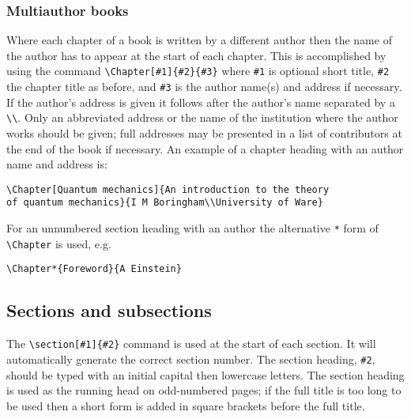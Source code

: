 \subsubsection{Multiauthor books}
Where each chapter of a book is written by a different author 
then the name of the author has to appear at the start of each 
chapter. This is accomplished by using the command
\hbox{\verb"\Chapter[#1]{#2}{#3}"} where \verb"#1" is 
optional short title, \verb"#2" the chapter title as before,
and \verb"#3" is the author name(s) and address if necessary.
If the author's address is given it follows after the author's name
separated by a \verb"\\". Only an abbreviated address or the name of the
institution where the author works should be given; full addresses may be
presented in a list of contributors at the end of the book if necessary. 
An example of a chapter heading with an author name
and address is:
\begin{verbatim}
\Chapter[Quantum mechanics]{An introduction to the theory
of quantum mechanics}{I M Boringham\\University of Ware}
\end{verbatim}
For an unnumbered section heading with an 
author the alternative \verb"*" form
of \verb"\Chapter" is used, e.g.
\begin{verbatim}
\Chapter*{Foreword}{A Einstein}
\end{verbatim}


 
\subsection{Sections and subsections}
The \verb"\section[#1]{#2}" command is used 
at the start of each section. It will 
automatically generate the correct section number. The section 
heading, \verb"#2",
should be typed with an initial capital then lowercase letters.
The section heading is used 
as the running head on odd-numbered pages; 
if the full
title is too long to be used then a short form is added in square brackets
before the full title. 


